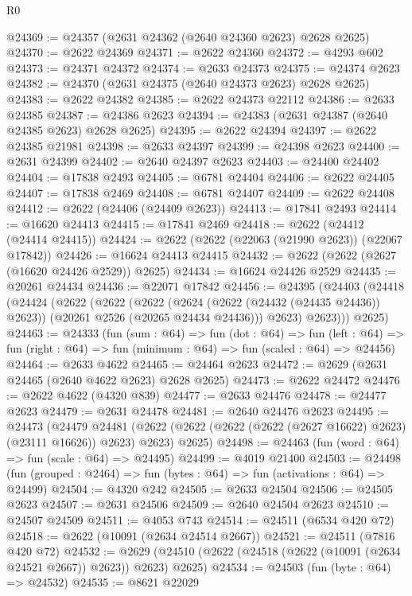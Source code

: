 \begin{lexlean}{R0}
\begin{coremodule}
@24369 := @24357 (@2631 @24362 (@2640 @24360 @2623) @2628 @2625)
@24370 := @2622 @24369
@24371 := @2622 @24360
@24372 := @4293 @602
@24373 := @24371 @24372
@24374 := @2633 @24373
@24375 := @24374 @2623
@24382 := @24370 (@2631 @24375 (@2640 @24373 @2623) @2628 @2625)
@24383 := @2622 @24382
@24385 := @2622 @24373 @22112
@24386 := @2633 @24385
@24387 := @24386 @2623
@24394 := @24383 (@2631 @24387 (@2640 @24385 @2623) @2628 @2625)
@24395 := @2622 @24394
@24397 := @2622 @24385 @21981
@24398 := @2633 @24397
@24399 := @24398 @2623
@24400 := @2631 @24399
@24402 := @2640 @24397 @2623
@24403 := @24400 @24402
@24404 := @17838 @2493
@24405 := @6781 @24404
@24406 := @2622 @24405
@24407 := @17838 @2469
@24408 := @6781 @24407
@24409 := @2622 @24408
@24412 := @2622 (@24406 (@24409 @2623))
@24413 := @17841 @2493
@24414 := @16620 @24413
@24415 := @17841 @2469
@24418 := @2622 (@24412 (@24414 @24415))
@24424 := @2622 (@2622 (@22063 (@21990 @2623)) (@22067 @17842))
@24426 := @16624 @24413 @24415
@24432 := @2622 (@2622 (@2627 (@16620 @24426 @2529)) @2625)
@24434 := @16624 @24426 @2529
@24435 := @20261 @24434
@24436 := @22071 @17842
@24456 := @24395
    (@24403
      (@24418
        (@24424
          (@2622
            (@2622
              (@2622
                (@2624 (@2622 (@24432 (@24435 @24436)) @2623))
                (@20261 @2526 (@20265 @24434 @24436)))
              @2623)
            @2623)))
      @2625)
@24463 := @24333
    (fun (sum : @64) =>
    fun (dot : @64) =>
    fun (left : @64) => fun (right : @64) => fun (minimum : @64) => fun (scaled : @64) => @24456)
@24464 := @2633 @4622
@24465 := @24464 @2623
@24472 := @2629 (@2631 @24465 (@2640 @4622 @2623) @2628 @2625)
@24473 := @2622 @24472
@24476 := @2622 @4622 (@4320 @839)
@24477 := @2633 @24476
@24478 := @24477 @2623
@24479 := @2631 @24478
@24481 := @2640 @24476 @2623
@24495 := @24473
    (@24479
      @24481
      (@2622 (@2622 (@2622 (@2622 (@2627 @16622) @2623) (@23111 @16626)) @2623) @2623)
      @2625)
@24498 := @24463 (fun (word : @64) => fun (scale : @64) => @24495)
@24499 := @4019 @21400
@24503 := @24498 (fun (grouped : @2464) => fun (bytes : @64) => fun (activations : @64) => @24499)
@24504 := @4320 @242
@24505 := @2633 @24504
@24506 := @24505 @2623
@24507 := @2631 @24506
@24509 := @2640 @24504 @2623
@24510 := @24507 @24509
@24511 := @4053 @743
@24514 := @24511 (@6534 @420 @72)
@24518 := @2622 (@10091 (@2634 @24514 @2667))
@24521 := @24511 (@7816 @420 @72)
@24532 := @2629 (@24510 (@2622 (@24518 (@2622 (@10091 (@2634 @24521 @2667)) @2623)) @2623) @2625)
@24534 := @24503 (fun (byte : @64) => @24532)
@24535 := @8621 @22029

\end{coremodule}
\end{lexlean}
